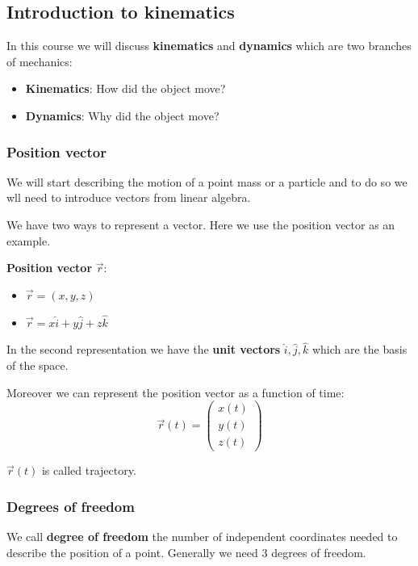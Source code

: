 \documentclass[10pt]{extarticle}
\begin{document}
\subsection{Introduction to kinematics}

In this course we will discuss \textbf{kinematics} and \textbf{dynamics} which are two branches of mechanics:
\begin{itemize}
    \item \textbf{Kinematics}: How did the object move?
    \item \textbf{Dynamics}: Why did the object move?
\end{itemize}

\subsubsection{Position vector}

We will start describing the motion of a point mass or a particle
and to do so we wll need to introduce vectors from linear algebra.

We have two ways to represent a vector.
Here we use the position vector as an example.

\textbf{Position vector} $\vec{r}$:
\begin{itemize}
    \item $\vec{r} = (x, y, z)$
    \item $\vec{r} = x \hat{i} + y \hat{j} + z \hat{k}$
\end{itemize}

In the second representation we have the \textbf{unit vectors} $\hat{i}, \hat{j}, \hat{k}$ which are the basis of the space.

Moreover we can represent the position vector as a function of time:
$$
    \vec{r}(t) = \begin{pmatrix} x(t) \\ y(t) \\ z(t) \end{pmatrix}
$$

$\vec {r}(t)$ is called trajectory.

\subsubsection{Degrees of freedom}

We call \textbf{degree of freedom} the number of independent coordinates needed to describe the position of a point.
Generally we need 3 degrees of freedom.
\end{document}
